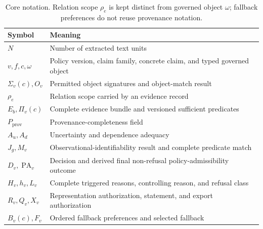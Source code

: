 \documentclass[manuscript,screen,review,anonymous]{acmart}
\begin{document}
\begin{table}[t]
  \caption{Core notation. Relation scope $\rho_e$ is kept distinct from governed object $\omega$; fallback preferences do not reuse provenance notation.}
  \label{tab:notation}
  \centering
  \small
  \begin{tabular}{@{}lp{}@{}}
    \toprule
    Symbol & Meaning \\
    \midrule
    $N$ & Number of extracted text units \\
    $v,f,c,\omega$ & Policy version, claim family, concrete claim, and typed governed object \\
    $\Sigma_v(c),O_v$ & Permitted object signatures and object-match result \\
    $\rho_e$ & Relation scope carried by an evidence record \\
    $E_b,\Pi_v(c)$ & Complete evidence bundle and versioned sufficient predicates \\
    $P_{\mathrm{prov}}$ & Provenance-completeness field \\
    $A_u,A_d$ & Uncertainty and dependence adequacy \\
    $J_g,M_v$ & Observational-identifiability result and complete predicate match \\
    $D_v,\operatorname{PA}_v$ & Decision and derived final non-refusal policy-admissibility outcome \\
    $H_v,h_v,L_v$ & Complete triggered reasons, controlling reason, and refusal class \\
    $R_v,Q_v,X_v$ & Representation authorization, statement, and export authorization \\
    $B_v(c),F_v$ & Ordered fallback preferences and selected fallback \\
    \bottomrule
  \end{tabular}
\end{table}
\end{document}
